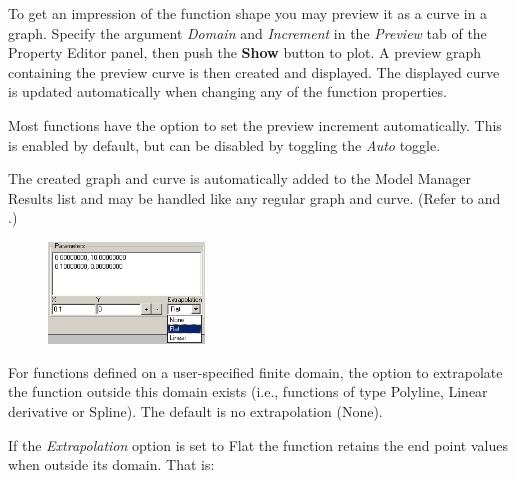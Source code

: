 To get an impression of the function shape you may preview it as a curve in
a graph. Specify the argument {\sl Domain} and {\sl Increment} in the
{\sl Preview} tab of the Property Editor panel, then push the
\textbf{Show} button to plot. A preview graph containing the preview
curve is then created and displayed. The displayed curve is updated
automatically when changing any of the function properties.

Most functions have the option to set the preview increment automatically. This
is enabled by default, but can be disabled by toggling the {\sl Auto} toggle.

The created graph and curve is automatically added to the Model Manager
Results list and may be handled like any regular graph and curve. (Refer
to 
and .)




\begin{figure}
  \vspace{-4mm}
  \includegraphics[width=0.37\textwidth]{Figures/4-FunctionExtrapMenu}
\end{figure}

For functions defined on a user-specified finite domain, the option to
extrapolate the function outside this domain exists (i.e., functions of type
Polyline, Linear derivative or Spline). The default is no extrapolation (None).

If the {\sl Extrapolation} option is set to Flat the function retains
the end point values when outside its domain. That is:

